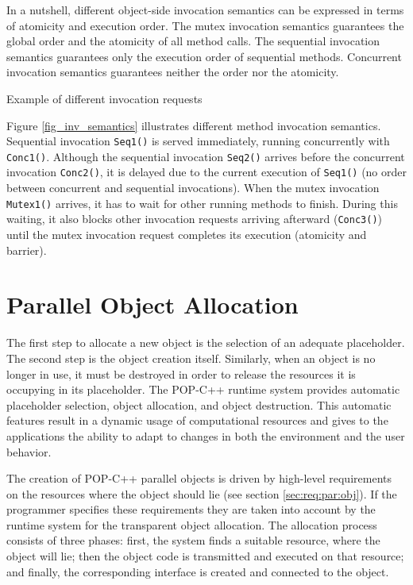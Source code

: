 In a nutshell, different object-side invocation semantics can be
expressed in terms of atomicity and execution order. The mutex
invocation semantics guarantees the global order and the atomicity of
all method calls. The sequential invocation semantics guarantees only
the execution order of sequential methods. Concurrent invocation
semantics guarantees neither the order nor the atomicity.

{Example of different invocation requests}

Figure \ref{fig_inv_semantics} illustrates different method invocation
semantics. Sequential invocation \texttt{Seq1()} is served immediately,
running concurrently with \texttt{Conc1()}. Although the sequential
invocation \texttt{Seq2()} arrives before the concurrent invocation
\texttt{Conc2()}, it is delayed due to the current execution of
\texttt{Seq1()} (no order between concurrent and sequential invocations).
When the mutex invocation \texttt{Mutex1()} arrives, it has to wait for
other running methods to finish. During this waiting, it also blocks
other invocation requests arriving afterward (\texttt{Conc3()}) until
the mutex invocation request completes its execution (atomicity and
barrier).


\section{Parallel Object Allocation}\label{sec:par:obj:all}


The first step to allocate a new object is the selection of an adequate
placeholder. The second step is the object creation itself. Similarly,
when an object is no longer in use, it must be destroyed in order to
release the resources it is occupying in its placeholder. The POP-C++
runtime system provides automatic placeholder selection, object
allocation, and object destruction. This automatic features result in a
dynamic usage of computational resources and gives to the applications
the ability to adapt to changes in both the environment and the user
behavior.

The creation of POP-C++ parallel objects is driven by high-level
requirements on the resources where the object should lie (see section
\ref{sec:req:par:obj}). If the programmer specifies these requirements
they are taken into account by the runtime system for the transparent 
object allocation. The allocation process consists of three phases: first, the system finds a suitable resource, where the
object will lie; then the object code is transmitted and executed on
that resource; and finally, the corresponding interface is created and
connected to the object.

